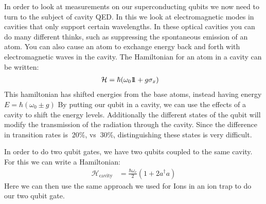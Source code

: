 In order to look at measurements on our superconducting qubits we now need to turn to the subject of cavity QED. In this we look at electromagnetic modes in cavities that only support certain wavelengths.
In these optical cavities you can do many different thinks, such as suppressing the spontaneous emission of an atom. You can also cause an atom to exchange energy back and forth with electromagnetic waves in the cavity.
The Hamiltonian for an atom in a cavity can be written:
\begin{align*}
	\mathcal{H} &= \hbar (\omega_0 1\!\!1 + g\sigma_x)
\end{align*}
This hamiltonian has shifted energies from the base atoms, instead having energy $E = \hbar(\omega_0 \pm g)$
By putting our qubit in a cavity, we can use the effects of a cavity to shift the energy levels. Additionally the different states of the qubit will modify the transmission of the radiation through the cavity.
Since the difference in transition rates is $~20\%$, vs $~30\%$, distinguishing these states is very difficult.

In order to do two qubit gates, we have two qubits coupled to the same cavity. For this we can write a Hamiltonian:
\begin{align*}
	\mathcal{H}_\text{cavity} &= \frac{\hbar\omega_c}{2}(1 + 2a^\dagger a)
\end{align*}
Here we can then use the same approach we used for Ions in an ion trap to do our two qubit gate.
